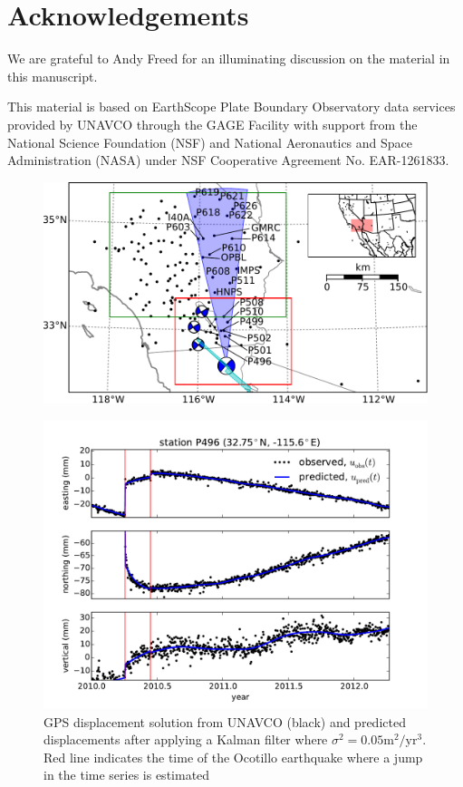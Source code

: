 \documentclass[12pt]{article}
\begin{document}
\section*{Acknowledgements}
We are grateful to Andy Freed for an illuminating discussion on the material in this manuscript.  
 
This material is based on EarthScope Plate Boundary Observatory data services provided by UNAVCO through the GAGE Facility with support from the National Science Foundation (NSF) and National Aeronautics and Space Administration (NASA) under NSF Cooperative Agreement No. EAR-1261833.




\begin{figure}
\includegraphics[scale=0.9]{Figures/context_map}
\centering 
\caption{}
\label{ContextMap}
\end{figure}

\begin{figure}
\includegraphics[scale=0.6]{Figures/figure_1}
\centering
\caption{GPS displacement solution from UNAVCO (black) and predicted displacements after applying a Kalman filter where $\sigma^2=0.05 \mathrm{m}^2/\mathrm{yr}^3$. Red line indicates the time of the Ocotillo earthquake where a jump in the time series is estimated}
\label{P496Fit}
\end{figure}
\end{document}
